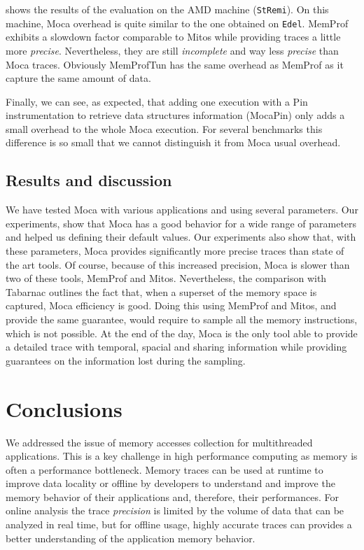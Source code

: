  shows the results of the evaluation on the AMD machine
(\texttt{StRemi}). On this machine, \gls{Moca} overhead is quite similar to the one
obtained on \texttt{Edel}.
\gls{MemProf} exhibits a slowdown factor comparable to \gls{Mitos} while
providing traces a little more \emph{precise}. Nevertheless, they are still \emph{incomplete} and
way less \emph{precise} than \gls{Moca} traces. Obviously MemProfTun has the same
overhead as \gls{MemProf} as it capture the same amount of data.

Finally, we can see, as expected, that adding one execution with a Pin instrumentation to retrieve data structures information (MocaPin) only adds a small overhead to the whole \gls{Moca} execution.
For several benchmarks this difference is so small that we cannot distinguish it from \gls{Moca} usual overhead.

\subsection{Results and discussion}

We have tested \gls{Moca} with various applications and using several parameters.
Our experiments, show that \gls{Moca} has a good behavior for a wide range of parameters and helped us defining their default values.
Our experiments also show that, with these parameters, \gls{Moca} provides significantly more precise traces than state of the art tools.
Of course, because of this increased precision, \gls{Moca} is slower than two of these tools, \gls{MemProf} and \gls{Mitos}.
Nevertheless, the comparison with \gls{Tabarnac} outlines the fact that, when a superset of the memory space is captured, \gls{Moca} efficiency is good.
Doing this using \gls{MemProf} and \gls{Mitos}, and provide the same guarantee, would require to sample all the memory instructions, which is not possible.
At the end of the day, \gls{Moca} is the only tool able to provide a detailed trace with temporal, spacial and sharing information while providing guarantees on the information lost during the sampling.


\section{Conclusions}

We addressed the issue of memory accesses collection for multithreaded applications.
This is a key challenge in high performance computing as memory is often a performance bottleneck.
Memory traces can be used at runtime to improve data locality or offline by developers to understand and improve the memory behavior of their applications and, therefore, their performances.
For online analysis the trace \emph{precision} is limited by the volume of data that can be analyzed in real time, but for offline usage, highly accurate traces can provides a better understanding of the application memory behavior.

